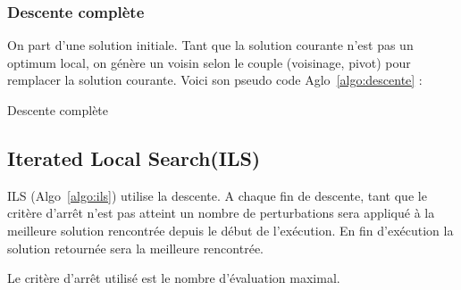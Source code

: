 \subsubsection{Descente complète}
On part d’une solution initiale. Tant que la solution courante n’est pas un optimum local, on génère un voisin selon le couple (voisinage, pivot) pour remplacer la solution courante. Voici son pseudo code Aglo~\ref{algo:descente} :

	\begin{algorithm}[H]
	\caption{Descente complète}
	\label{algo:descente}
	\begin{algorithmic}[1]
		\Statex
		
		 
		
		\EndWhile
		
		\State {}
		\EndFunction
		
		
	\end{algorithmic}
\end{algorithm}

\subsection{Iterated Local Search(ILS)}
ILS (Algo~\ref{algo:ils}) utilise la descente. A chaque fin de descente, tant que le critère d’arrêt n’est pas atteint un nombre de perturbations sera appliqué à la meilleure solution rencontrée depuis le début de l’exécution. En fin d’exécution
la solution retournée sera la meilleure rencontrée. 


Le critère d'arrêt utilisé est le nombre d’évaluation maximal.

